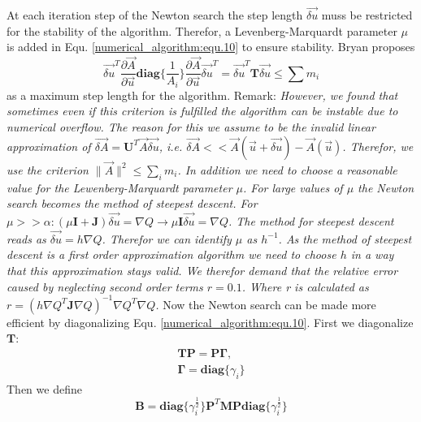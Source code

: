At each iteration step of the Newton search the step length $\vec{\delta u}$ muss be restricted for the stability of the algorithm.
Therefor, a Levenberg-Marquardt parameter $\mu$ is added in Equ. \ref{numerical_algorithm:equ.10} to ensure stability.
Bryan proposes 
\begin{equation}
	\vec{\delta u}^T \frac{\partial \vec A}{\partial \vec u}\mathbf{diag}\{\frac{1}{A_i}\}\frac{\partial \vec A}{\partial \vec u}
	\vec{\delta u}^T = \vec{\delta u}^T \mathbf{T} \vec{\delta u} \leq \sum m_i
\end{equation}
as a maximum step length for the algorithm.\newline
Remark:\newline
\textit{However, we found that sometimes even if this criterion is fulfilled the algorithm can be instable due to numerical overflow. The reason for this we assume to be the invalid linear approximation of $\vec {\delta A} = \mathbf{U}^T \vec A\vec{\delta u}$, i.e. $\vec{\delta A} << \vec A(\vec u + \vec{\delta u}) - \vec A(\vec u)$. 
Therefor, we use the criterion $\parallel \vec A \parallel^2 \leq \sum_i m_i$. In addition we need to choose a reasonable value for the Lewenberg-Marquardt parameter $\mu$. For large values of $\mu$ the Newton search becomes the method of steepest descent. For $\mu >> \alpha: (\mu \mathbf{I} + \mathbf{J})\vec{\delta u} = \nabla Q \rightarrow \mu \mathbf{I} \vec{\delta u} = \nabla Q$. The method for steepest descent reads as $\vec{\delta u} = h \nabla Q$. Therefor we can identify $\mu$ as $h^{-1}$. As the method of steepest descent is a first order approximation algorithm we need to choose $h$ in a way that this approximation stays valid. We therefor demand that the relative error caused by neglecting second order terms $r = 0.1$. Where r is calculated as $r = (h\nabla Q^T \mathbf{J}\nabla Q)^{-1}\nabla Q^T\nabla Q$.}\newline
Now the Newton search can be made more efficient by diagonalizing Equ. \ref{numerical_algorithm:equ.10}. First we diagonalize $\mathbf{T}$:
\begin{equation}
	\begin{gathered}
		\mathbf{T} \mathbf{P} = \mathbf{P} \mathbf{\Gamma},\\
		\mathbf{\Gamma} = \mathbf{diag} \{\gamma_i\}
	\end{gathered}
	\label{numerical_algorithm:equ.11}
\end{equation}
Then we define
\begin{equation}
	\mathbf{B} = \mathbf{diag} \{ \gamma_i^{\frac{1}{2}}\}\mathbf{P}^T \mathbf{M}\mathbf{P}\mathbf{diag}\{ \gamma_i^{\frac{1}{2}}\}
	\label{numerical_algorithm:equ.12}
\end{equation}
